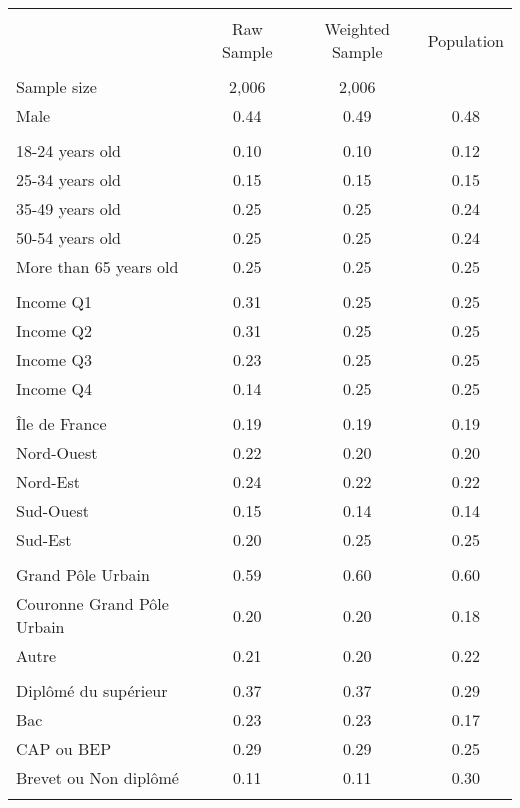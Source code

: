 \begin{tabular}{lccc}
\toprule
\hline \\[-1.8ex]
\noalign{\smallskip}  & Raw Sample & Weighted Sample & Population\\
\hline \\[-1.8ex] 
Sample size & 2,006 & 2,006 &  \\
\noalign{\smallskip}\hline \noalign{\smallskip}Male & 0.44 & 0.49 & 0.48\\ 
\\
18-24 years old & 0.10 & 0.10 & 0.12\\
25-34 years old & 0.15 & 0.15 & 0.15\\
35-49 years old & 0.25 & 0.25 & 0.24\\
50-54 years old & 0.25 & 0.25 & 0.24\\
More than 65 years old & 0.25 & 0.25 & 0.25\\ 
\\
Income Q1 & 0.31 & 0.25 & 0.25\\
Income Q2 & 0.31 & 0.25 & 0.25\\
Income Q3 & 0.23 & 0.25 & 0.25\\
Income Q4 & 0.14 & 0.25 & 0.25\\
\\
Île de France & 0.19 & 0.19 & 0.19\\
Nord-Ouest & 0.22 & 0.20 & 0.20\\
Nord-Est & 0.24 & 0.22 & 0.22\\
Sud-Ouest & 0.15 & 0.14 & 0.14\\
Sud-Est & 0.20 & 0.25 & 0.25\\
\\
Grand Pôle Urbain & 0.59 & 0.60 & 0.60\\
Couronne Grand Pôle Urbain & 0.20 & 0.20 & 0.18\\
Autre & 0.21 & 0.20 & 0.22\\
\\
Diplômé du supérieur & 0.37 & 0.37 & 0.29\\
Bac & 0.23 & 0.23 & 0.17\\
CAP ou BEP & 0.29 & 0.29 & 0.25\\
Brevet ou Non diplômé & 0.11 & 0.11 & 0.30\\
\\
\end{tabular}